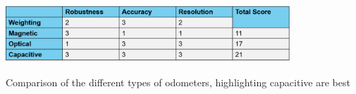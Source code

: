 \documentclass[11pt]{article}		%
\newcommand{\supercite}[1]{\textsuperscript{\cite{#1}}}		%
\newcommand{\tableref}[1]{\hyperref[#1]{Table \ref*{#1}}}     %
\begin{document}
	        
	        
	        
	        
	        
	        \begin{table}[h]
    			\centering
    			\includegraphics[width=0.8\textwidth]{Encoder comparison table}
    			\caption{Comparison of the different types of odometers, highlighting capacitive are best}
    			\label{odometer_comparison}
			\end{table}
					
\end{document}
